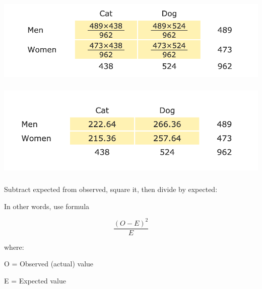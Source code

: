 \documentclass[t, 11pt]{beamer}
\begin{document}
	\begin{frame} 
		\frametitle{\insertsection} 	
		
		\begin{center}
			\includegraphics[scale=0.7]{chi3}
		\end{center}
		
	\end{frame}
	
	\begin{frame} 
		\frametitle{\insertsection} 	
		
		\begin{center}
			\includegraphics[scale=0.7]{chi4}
		\end{center}
		
	\end{frame}

		\begin{frame} 
	\frametitle{\insertsection} 	

Subtract expected from observed, square it, then divide by expected:

In other words, use formula 

$$\frac{(O - E)^2}{E}$$

where:

\vspace{1cm}

O = Observed (actual) value

E = Expected value

	
\end{frame}
	
\end{document}
